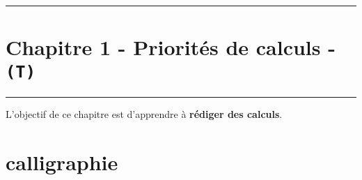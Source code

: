 \documentclass[11pt]{article}
\newcommand{\horrule}[1]{\rule{\linewidth}{#1}} %
\begin{document}
\setlength{\columnseprule}{1pt}

\horrule{2px}
\section*{Chapitre 1 - Priorités de calculs - \texttt{(T)}}
\horrule{2px}

L'objectif de ce chapitre est d'apprendre à \textbf{rédiger des calculs}.

\section*{calligraphie}
\end{document}
